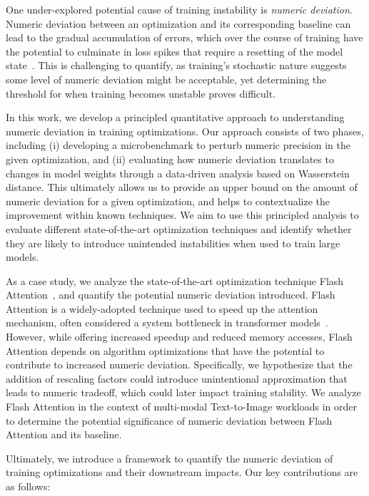 One under-explored potential cause of training instability is \textit{numeric deviation}. Numeric deviation between an optimization and its corresponding baseline can lead to the gradual accumulation of errors, which over the course of training have the potential to culminate in loss spikes that require a resetting of the model state~\cite{chowdhery2022palm}. This is challenging to quantify, as training's stochastic nature suggests some level of numeric deviation might be acceptable, yet determining the threshold for when training becomes unstable proves difficult.

In this work, we develop a principled quantitative approach to understanding numeric deviation in training optimizations. Our approach consists of two phases, including (i) developing a microbenchmark to perturb numeric precision in the given optimization, and (ii) evaluating how numeric deviation translates to changes in model weights through a data-driven analysis based on Wasserstein distance. This ultimately allows us to provide an upper bound on the amount of numeric deviation for a given optimization, and helps to contextualize the improvement within known techniques. We aim to use this principled analysis to evaluate different state-of-the-art optimization techniques and identify whether they are likely to introduce unintended instabilities when used to train large models. 

As a case study, we analyze the state-of-the-art optimization technique Flash Attention~\cite{dao2022flashattention}, and quantify the potential numeric deviation introduced. Flash Attention is a widely-adopted technique used to speed up the attention mechanism, often considered a system bottleneck in transformer models~\cite{vaswani2023attention}. However, while offering increased speedup and reduced memory accesses, Flash Attention depends on algorithm optimizations that have the potential to contribute to increased numeric deviation. Specifically, we hypothesize that the addition of rescaling factors could introduce unintentional approximation that leads to numeric tradeoff, which could later impact training stability. We analyze Flash Attention in the context of multi-modal Text-to-Image workloads in order to determine the potential significance of numeric deviation between Flash Attention and its baseline. 

Ultimately, we introduce a framework to quantify the numeric deviation of training optimizations and their downstream impacts. Our key contributions are as follows:

